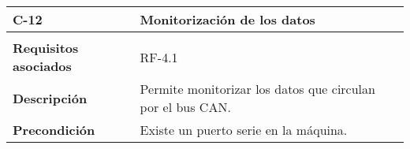 \begin{longtable}[H]{@{}ll@{}}
\toprule
\begin{minipage}[b]{0.23\columnwidth}\raggedright\strut
\textbf{C-12}\strut
\end{minipage} & \begin{minipage}[b]{0.71\columnwidth}\raggedright\strut
\textbf{Monitorización de los datos}\strut
\end{minipage}\tabularnewline
\midrule
\endhead
\tabularnewline
\begin{minipage}[t]{0.23\columnwidth}\raggedright\strut
\textbf{Requisitos asociados}\strut
\end{minipage} & \begin{minipage}[t]{0.71\columnwidth}\raggedright\strut
RF-4.1\strut
\end{minipage}\tabularnewline
\begin{minipage}[t]{0.23\columnwidth}\raggedright\strut
\textbf{Descripción}\strut
\end{minipage} & \begin{minipage}[t]{0.71\columnwidth}\raggedright\strut
Permite monitorizar los datos que circulan por el bus CAN.\strut
\end{minipage}\tabularnewline
\begin{minipage}[t]{0.23\columnwidth}\raggedright\strut
\textbf{Precondición}\strut
\end{minipage} & \begin{minipage}[t]{0.71\columnwidth}\raggedright\strut
Existe un puerto serie en la máquina.


\end{minipage}
\end{longtable}
